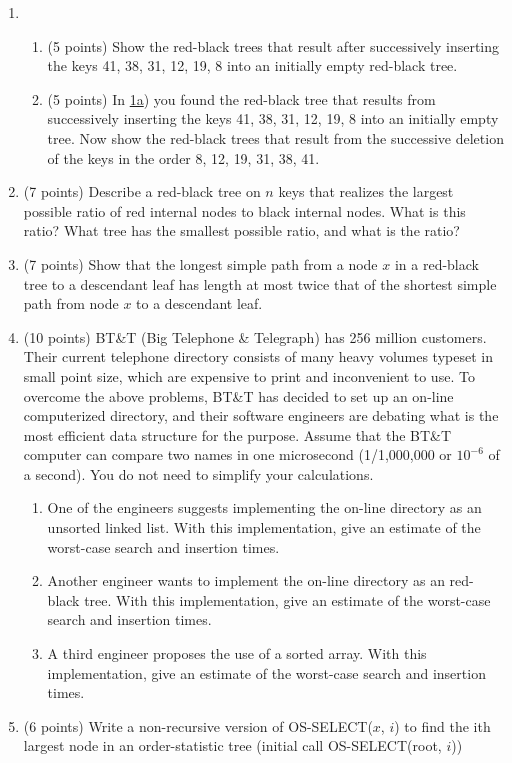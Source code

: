 \documentclass[4]{cs430homework}
\begin{document}
\maketitle

\begin{enumerate}[label=\arabic*.]
	\item
    \begin{enumerate}[label=\arabic{enumi}\alph*)]
        \item\label{prb:1a} (5 points) Show the red-black trees that result after successively inserting the keys 41, 38, 31, 12, 19, 8 into an initially empty red-black tree.
		\item (5 points) In \hyperref[prb:1a]{1a}) you found the red-black tree that results from successively inserting the keys 41, 38, 31, 12, 19, 8 into an initially empty tree. Now show the red-black trees that result from the successive deletion of the keys in the order 8, 12, 19, 31, 38, 41.
    \end{enumerate}
	\setcounter{enumi}{1}
	\item (7 points) Describe a red-black tree on $n$ keys that realizes the largest possible ratio of red internal nodes to black internal nodes. What is this ratio? What tree has the smallest possible ratio, and what is the ratio?
	\item (7 points) Show that the longest simple path from a node $x$ in a red-black tree to a descendant leaf has length at most twice that of the shortest simple path from node $x$ to a descendant leaf.
	\item (10 points) BT\&T (Big Telephone \& Telegraph) has 256 million customers. Their current telephone directory consists of many heavy volumes typeset in small point size, which are expensive to print and inconvenient to use. To overcome the above problems, BT\&T has decided to set up an on-line computerized directory, and their software engineers are debating what is the most efficient data structure for the purpose. Assume that the BT\&T computer can compare two names in one microsecond (1/1,000,000 or $10^{-6}$ of a second). You do not need to simplify your calculations.
	\begin{enumerate}[label=\arabic{enumi}\alph*)]
	    \item One of the engineers suggests implementing the on-line directory as an unsorted linked list. With this implementation, give an estimate of the worst-case search and insertion times.
		\item Another engineer wants to implement the on-line directory as an red-black tree. With this implementation, give an estimate of the worst-case search and insertion times.
		\item A third engineer proposes the use of a sorted array. With this implementation, give an estimate of the worst-case search and insertion times.
	\end{enumerate}
	\item (6 points) Write a non-recursive version of OS-SELECT($x$, $i$) to find the ith largest node in an order-statistic tree (initial call OS-SELECT(root, $i$))
\end{enumerate}
\end{document}
